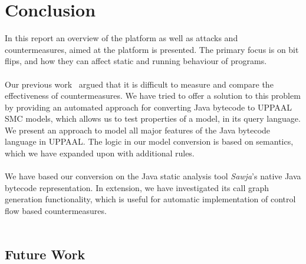 \chapter{Conclusion}
In this report an overview of the \jc platform as well as attacks and countermeasures, aimed at the platform is presented. The primary focus is on bit flips, and how they can affect static and running behaviour of programs.\\\\
Our previous work~\cite{javasec} argued that it is difficult to measure and compare the effectiveness of countermeasures. We have tried to offer a solution to this problem by providing an automated approach for converting Java bytecode to UPPAAL SMC models, which allows us to test properties of a model, in its query language. We present an approach to model all major features of the Java bytecode language in UPPAAL. The logic in our model conversion is based on \jcl semantics, which we have expanded upon with additional rules.\\\\
We have based our conversion on the Java static analysis tool \textit{Sawja}'s native Java bytecode representation. In extension, we have investigated its call graph generation functionality, which is useful for automatic implementation of control flow based countermeasures.\\\\



\section{Future Work}




